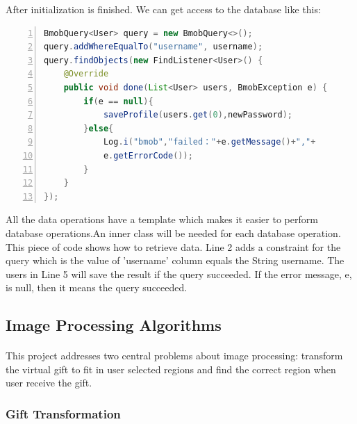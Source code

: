 \par After initialization is finished. We can get access to the database like this:
\begin{lstlisting}[language={java},
        numbers=left,basicstyle=\small\ttfamily]
BmobQuery<User> query = new BmobQuery<>();
query.addWhereEqualTo("username", username);
query.findObjects(new FindListener<User>() {
    @Override
    public void done(List<User> users, BmobException e) {
        if(e == null){
            saveProfile(users.get(0),newPassword);
        }else{
            Log.i("bmob","failed："+e.getMessage()+","+
            e.getErrorCode());
        }
    }
});
\end{lstlisting} 
\par All the data operations have a template which makes it easier to perform database operations.An inner class will be needed for each database operation. This piece of code shows how to retrieve data. Line 2 adds a constraint for the query which is the value of 'username' column equals the String username. The users in Line 5 will save the result if the query succeeded. If the error message, e, is null, then it means the query succeeded. 
\subsection{Image Processing Algorithms}
\paragraph{}This project addresses two central problems about image processing: transform the virtual gift to fit in user selected regions and find the correct region when user receive the gift. 

\subsubsection{Gift Transformation}
